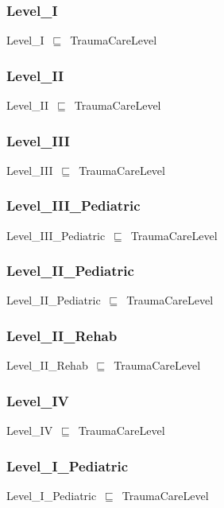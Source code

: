 \documentclass{article}
\begin{document}
\subsubsection*{Level\_I}

Level\_I~\ensuremath{\sqsubseteq}~TraumaCareLevel~

\subsubsection*{Level\_II}

Level\_II~\ensuremath{\sqsubseteq}~TraumaCareLevel~

\subsubsection*{Level\_III}

Level\_III~\ensuremath{\sqsubseteq}~TraumaCareLevel~

\subsubsection*{Level\_III\_Pediatric}

Level\_III\_Pediatric~\ensuremath{\sqsubseteq}~TraumaCareLevel~

\subsubsection*{Level\_II\_Pediatric}

Level\_II\_Pediatric~\ensuremath{\sqsubseteq}~TraumaCareLevel~

\subsubsection*{Level\_II\_Rehab}

Level\_II\_Rehab~\ensuremath{\sqsubseteq}~TraumaCareLevel~

\subsubsection*{Level\_IV}

Level\_IV~\ensuremath{\sqsubseteq}~TraumaCareLevel~

\subsubsection*{Level\_I\_Pediatric}

Level\_I\_Pediatric~\ensuremath{\sqsubseteq}~TraumaCareLevel~
\end{document}
